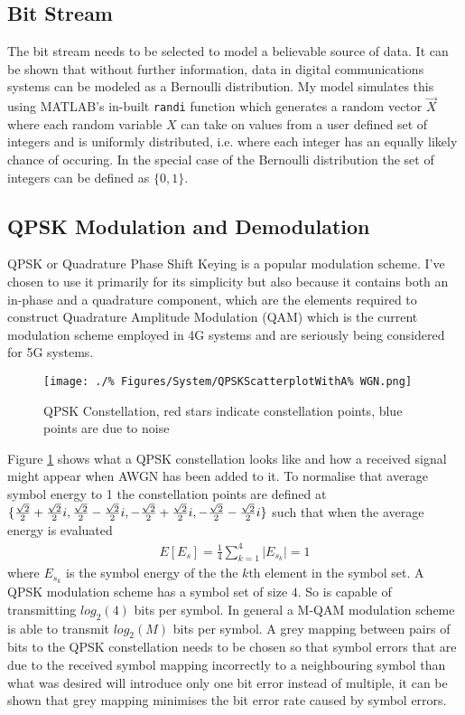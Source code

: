 \subsection{Bit Stream}
The bit stream needs to be selected to model %
a believable source of data. It can be shown %
that without further information, data %
in digital communications systems can be %
modeled as a Bernoulli distribution. %
My model simulates this using MATLAB's in-built %
\texttt{randi} \cite{randi} function which generates %
a random vector $\vec{X}$ where each %
random variable $X$ can take on values from %
a user defined set of integers and is %
uniformly distributed, i.e. where each integer %
has an equally likely chance of occuring. In %
the special case of the Bernoulli distribution %
the set of integers can be defined as $\{0,1\}$.

\subsection{QPSK Modulation and Demodulation}
\FloatBarrier
QPSK or Quadrature Phase Shift Keying is a popular %
modulation scheme. I've chosen to use it primarily %
for its simplicity but also because it contains both
an in-phase and a quadrature component, which are %
the elements required to construct %
Quadrature Amplitude Modulation (QAM) %
which is the current modulation scheme employed %
in 4G systems \cite{Rumney13}
and are seriously being considered for 5G systems.
\begin{figure}[ht]
	\centering
	\texttt{[image: ./\%
	Figures/System/QPSKScatterplotWithA\%
	WGN.png]}
	\caption{QPSK Constellation, red stars %
	indicate constellation points, blue %
	points are due to noise}
	\label{fig:QPSKConstellation}
\end{figure}

Figure \ref{fig:QPSKConstellation} shows what %
a QPSK constellation looks like and how a %
received signal might appear when AWGN has %
been added to it. To normalise that average %
symbol energy to 1 the constellation points %
are defined at $\{\frac{\sqrt{2}}{2} + \frac{%
\sqrt{2}}{2}i, \frac{\sqrt{2}}{2} - %
\frac{\sqrt{2}}{2}i, -\frac{\sqrt{2}%
}{2} + \frac{\sqrt{2}}{2}i, %
-\frac{\sqrt{2}}{2} - \frac{\sqrt{2}%
}{2}i\}$ such that when the average %
energy is evaluated
\begin{align}
	E\left[E_s\right] = \frac{1}{4} \sum_{k=1}^{4} %
	\lvert E_{s_{k}} \rvert = 1
\end{align}
where $E_{s_{k}}$ is the symbol energy of the the %
$k\text{th}$ element in the symbol set. A QPSK %
modulation scheme has a symbol set of size $4$. %
So is capable of transmitting $log_{2}(4)$ bits %
per symbol. In general a M-QAM modulation scheme %
is able to transmit $log_{2}(M)$ bits per symbol. %
A grey mapping between pairs of bits to the QPSK %
constellation needs to be chosen so that symbol %
errors that are due to the received symbol mapping %
incorrectly to a neighbouring symbol than what was %
desired will introduce only one bit error instead %
of multiple, it can be shown that grey mapping %
minimises the bit error rate caused by %
symbol errors. %


